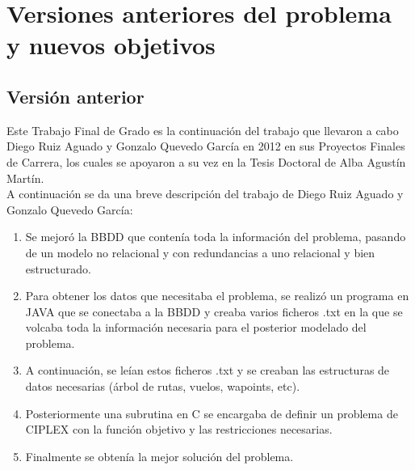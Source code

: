 \section{Versiones anteriores del problema y nuevos objetivos}

\subsection{Versión anterior}
Este Trabajo Final de Grado es la continuación del trabajo que llevaron a cabo Diego Ruiz Aguado y Gonzalo Quevedo García en 2012 en sus Proyectos Finales de Carrera, los cuales se apoyaron a su vez en la Tesis Doctoral de Alba Agustín  Martín.\\

A continuación se da una breve descripción del trabajo de  Diego Ruiz Aguado y Gonzalo Quevedo García:
\begin{enumerate}
	\item Se mejoró la BBDD que contenía toda la información del problema, pasando de un modelo no relacional y con redundancias a uno relacional y bien estructurado.
	\item Para obtener los datos que necesitaba el problema, se realizó un programa en JAVA que se conectaba a la BBDD y creaba varios ficheros .txt en la que se volcaba toda la información necesaria para el posterior modelado del problema.
	\item A continuación, se leían estos ficheros .txt y se creaban las estructuras de datos necesarias (árbol de rutas, vuelos, wapoints, etc).
	\item Posteriormente una subrutina en C se encargaba de definir un problema de CIPLEX con la función objetivo y las restricciones necesarias.
	\item Finalmente se obtenía la mejor solución del problema.
\end{enumerate}



